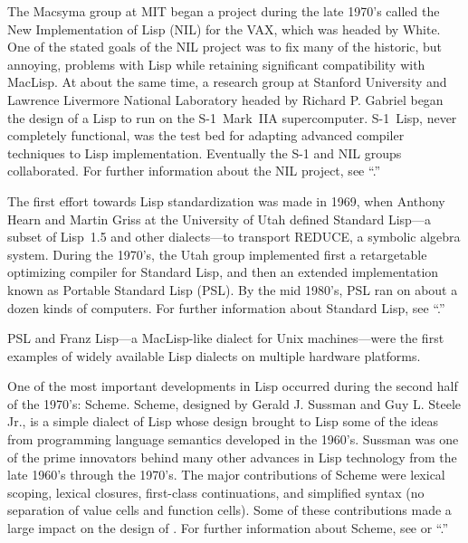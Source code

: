 The Macsyma group at MIT began a project during the late 1970's called
the New Implementation of Lisp (NIL) for the VAX, which was headed by
White.  One of the stated goals of the NIL project was to fix many of
the historic, but annoying, problems with Lisp while retaining significant 
compatibility with MacLisp.  At about the same time, a research group at
Stanford University and Lawrence Livermore National Laboratory headed
by Richard P. Gabriel began the design of a Lisp to run on the
\hbox{S-1}~Mark~IIA supercomputer.  \hbox{S-1}~Lisp, never completely
functional, was the test bed for adapting advanced compiler techniques
to Lisp implementation.  Eventually the \hbox{S-1} and NIL groups
collaborated.
For further information about the NIL project,
see ``{\NILReport}.''
 
%

The first effort towards Lisp standardization was made in 1969, 
when Anthony Hearn and Martin Griss at the University of Utah 
defined Standard Lisp---a subset of Lisp~1.5 and other dialects---to 
transport REDUCE, a symbolic algebra system.
During the 1970's, the Utah group implemented first a retargetable
optimizing compiler for Standard Lisp,
and then an extended implementation known as Portable Standard Lisp (PSL).
By the mid 1980's, PSL ran on about a dozen kinds of computers.
For further information about Standard Lisp, see ``{\StandardLispReport}.''
 
PSL and Franz Lisp---a MacLisp-like dialect for Unix machines---were 
the first examples of widely available Lisp dialects on multiple 
hardware platforms. 

One of the most important developments in Lisp occurred during the
second half of the 1970's: Scheme. Scheme, designed by Gerald J.
Sussman and Guy L. Steele Jr., is a simple dialect of Lisp whose
design brought to Lisp some of the ideas from programming language
semantics developed in the 1960's.  Sussman was one of the prime
innovators behind many other advances in Lisp technology from the late
1960's through the 1970's.
The major contributions of Scheme were lexical scoping, lexical
closures, first-class continuations, and simplified syntax (no
separation of value cells and function cells). Some of these contributions made
a large impact on the design of \clisp.
For further information about Scheme, see {\IEEEScheme} or ``{\RevisedCubedScheme}.''

